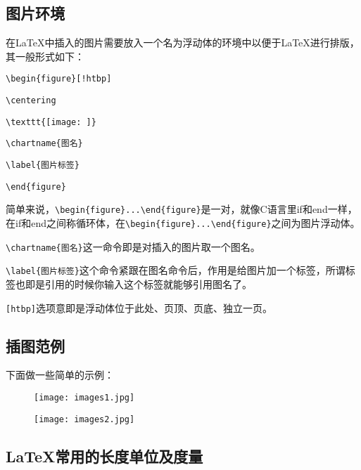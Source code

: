 \subsection{图片环境}

在\LaTeX 中插入的图片需要放入一个名为浮动体的环境中以便于\LaTeX 进行排版，其一般形式如下：

\verb|\begin{figure}[!htbp]|\par
\verb|\centering|\par
\verb|\texttt{[image: ]}|\par
\verb|\chartname{图名}|\par
\verb|\label{图片标签}|\par
\verb|\end{figure}|

简单来说，\verb|\begin{figure}...\end{figure}|是一对，就像C语言里if和end一样，在if和end之间称循环体，在\verb|\begin{figure}...\end{figure}|之间为图片浮动体。

\verb|\chartname{图名}|这一命令即是对插入的图片取一个图名。

\verb|\label{图片标签}|这个命令紧跟在图名命令后，作用是给图片加一个标签，所谓标签也即是引用的时候你输入这个标签就能够引用图名了。

\verb|[htbp]|选项意即是浮动体位于此处、页顶、页底、独立一页。

\subsection{插图范例}

下面做一些简单的示例：

\begin{figure}[!htb]
  \begin{minipage}[t]{0.5\linewidth}
    \centering
     \texttt{[image: images1.jpg]}
     \label{fig:1}
  \end{minipage}%
  \begin{minipage}[t]{0.5\linewidth}
    \centering
    \texttt{[image: images2.jpg]}
    \label{fig:2}
  \end{minipage}
\end{figure}

\subsection{\LaTeX 常用的长度单位及度量}

